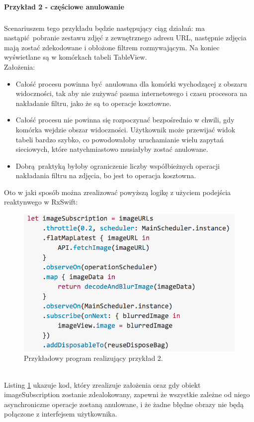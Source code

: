\documentclass[12pt,oneside,a4paper]{report}
\begin{document}
\paragraph{Przykład 2 - częściowe anulowanie}
\subparagraph{}Scenariuszem tego przykładu będzie następujący ciąg działań: ma nastąpić pobranie zestawu zdjęć z zewnętrznego adresu URL, następnie zdjęcia mają zostać zdekodowane i obłożone filtrem rozmywającym. Na koniec wyświetlane są w komórkach tabeli TableView.\\
Założenia: 
\begin{itemize}
	\item Całość procesu powinna być anulowana dla komórki wychodzącej z obszaru widoczności, tak aby nie zużywać pasma internetowego i czasu procesora na nakładanie filtru, jako że są to operacje kosztowne.
	\item Całość procesu nie powinna się rozpoczynać bezpośrednio w chwili, gdy komórka wejdzie obszar widoczności. Użytkownik może przewijać widok tabeli bardzo szybko, co powodowałoby uruchamianie wielu zapytań sieciowych, które natychmiastowo musiałyby zostać anulowane.
	\item Dobrą praktyką byłoby ograniczenie liczby współbieżnych operacji nakładania filtru na zdjęcia, bo jest to operacja kosztowna.
\end{itemize}
Oto w jaki sposób można zrealizować powyższą logikę z użyciem podejścia reaktynwego w RxSwift: 
\begin{figure}[ht!]
	\centering
	\includegraphics[width=12cm]{compositionalDisposal}
	\caption{Przykładowy program realizujący przykład 2.\cite{transientState}}
	\label{compositionalDisposal}
\end{figure}\\
Listing \ref{compositionalDisposal} ukazuje kod, który zrealizuje założenia oraz gdy obiekt imageSubscription zostanie zdealokowany, zapewni że wszystkie zależne od niego asynchroniczne operacje zostaną anulowane, i że żadne błędne obrazy nie będą połączone z interfejsem użytkownika.
\pagebreak
\end{document}
